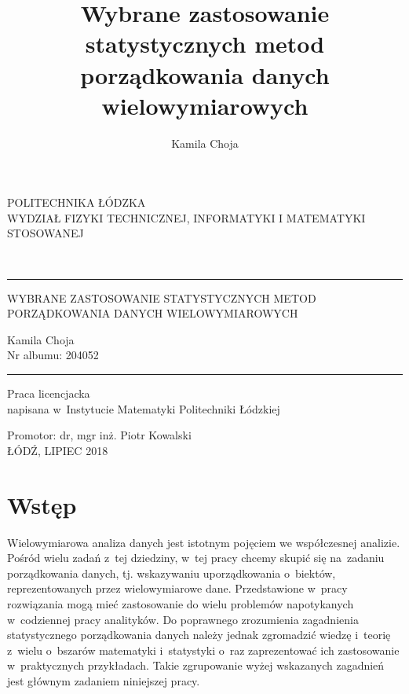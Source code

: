 \documentclass[12pt,a4paper]{report}
\author{Kamila Choja}
\title{Wybrane zastosowanie statystycznych metod porządkowania danych wielowymiarowych}
\begin{document}
\begin{titlepage}
\begin{center}
        \vspace*{1cm}
        {\large POLITECHNIKA ŁÓDZKA}\\
       \vspace*{1cm}
        {\large WYDZIAŁ FIZYKI TECHNICZNEJ, INFORMATYKI I MATEMATYKI STOSOWANEJ}\\
        \vspace*{2cm}
    \end{center}        
        
\\
\vspace*{0.3cm}
\hspace*{0.3cm}
  
\begin{center}
\rule{\textwidth}{0.5pt}

\vspace*{0.5cm}
   
{\large WYBRANE ZASTOSOWANIE STATYSTYCZNYCH METOD\\ }
{\large PORZĄDKOWANIA DANYCH WIELOWYMIAROWYCH\\}
\vspace*{1cm}


\begin{flushright}
Kamila Choja\\
Nr albumu: 204052 
 \end{flushright}
\rule{\textwidth}{0.5pt}

Praca licencjacka\\
napisana w~Instytucie Matematyki Politechniki Łódzkiej\\

\vspace*{2cm}

Promotor: dr, mgr inż. Piotr Kowalski\\
\vfill
ŁÓDŹ, LIPIEC 2018


     \end{center}   
\end{titlepage}

\tableofcontents

\chapter{Wstęp}
Wielowymiarowa analiza danych jest istotnym pojęciem we współczesnej analizie. Pośród wielu zadań z~tej dziedziny, w~tej pracy chcemy skupić się na~zadaniu porządkowania danych, tj. wskazywaniu uporządkowania o~biektów, reprezentowanych przez wielowymiarowe dane. Przedstawione w~pracy rozwiązania mogą mieć zastosowanie do wielu problemów napotykanych w~codziennej pracy analityków. Do poprawnego zrozumienia zagadnienia statystycznego porządkowania danych należy jednak zgromadzić wiedzę i~teorię z~wielu o~bszarów matematyki i~statystyki o~raz zaprezentować ich zastosowanie w~praktycznych przykładach. Takie zgrupowanie wyżej wskazanych zagadnień jest głównym zadaniem niniejszej pracy. 
\end{document}
